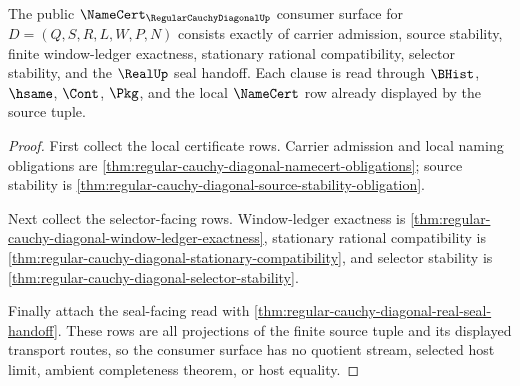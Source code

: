 \begin{theorem}
\label{thm:regular-cauchy-diagonal-namecert-consumer-surface}
The public $\NameCert_{\RegularCauchyDiagonalUp}$ consumer surface for $D=(Q,S,R,L,W,P,N)$ consists exactly of carrier admission, source stability, finite window-ledger exactness, stationary rational compatibility, selector stability, and the $\RealUp$ seal handoff. Each clause is read through $\BHist$, $\hsame$, $\Cont$, $\Pkg$, and the local $\NameCert$ row already displayed by the source tuple.
\end{theorem}
\begin{proof}
First collect the local certificate rows. Carrier admission and local naming obligations are \autoref{thm:regular-cauchy-diagonal-namecert-obligations}; source stability is \autoref{thm:regular-cauchy-diagonal-source-stability-obligation}.

Next collect the selector-facing rows. Window-ledger exactness is \autoref{thm:regular-cauchy-diagonal-window-ledger-exactness}, stationary rational compatibility is \autoref{thm:regular-cauchy-diagonal-stationary-compatibility}, and selector stability is \autoref{thm:regular-cauchy-diagonal-selector-stability}.

Finally attach the seal-facing read with \autoref{thm:regular-cauchy-diagonal-real-seal-handoff}. These rows are all projections of the finite source tuple and its displayed transport routes, so the consumer surface has no quotient stream, selected host limit, ambient completeness theorem, or host equality.
\end{proof}

